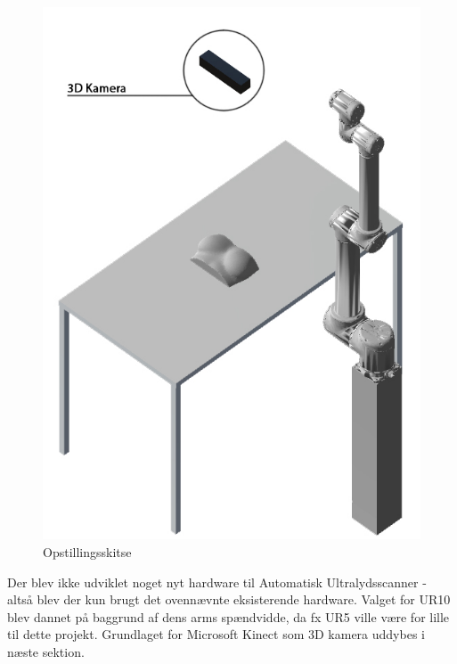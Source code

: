 \begin{figure}[H]
\begin{minipage}{0.4\textwidth}
    \includegraphics[width=\textwidth]{figurer/3d_setup}
    \caption{Opstillingsskitse}
    \label{3dsetup}
  \end{minipage}
\end{figure}

Der blev ikke udviklet noget nyt hardware til Automatisk Ultralydsscanner - altså blev der kun brugt det ovennævnte eksisterende hardware. Valget for UR10 blev dannet på baggrund af dens arms spændvidde, da fx UR5 ville være for lille til dette projekt. Grundlaget for Microsoft Kinect som 3D kamera uddybes i næste sektion.
\newpage

